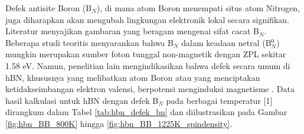 \label{subsec:hbn_defek_bn}
Defek antisite Boron (B$_N$), di mana atom Boron menempati situs atom Nitrogen, juga diharapkan akan mengubah lingkungan elektronik lokal secara signifikan. Literatur menyajikan gambaran yang beragam mengenai sifat cacat B$_N$. Beberapa studi teoritis menyarankan bahwa B$_N$ dalam keadaan netral (B$_N^0$) mungkin merupakan sumber foton tunggal non-magnetik dengan ZPL sekitar 1.58 eV. Namun, penelitian lain mengindikasikan bahwa defek secara umum di hBN, khususnya yang melibatkan atom Boron atau yang menciptakan ketidakseimbangan elektron valensi, berpotensi menginduksi magnetisme \citep{Zhang2020}. Data hasil kalkulasi untuk hBN dengan defek B$_N$ pada berbagai temperatur [1] dirangkum dalam Tabel \ref{tab:hbn_defek_bn} dan diilustrasikan pada Gambar \ref{fig:hbn_BB_800K} hingga \ref{fig:hbn_BB_1225K_spindensity}. \begin{table}[h!]
  \centering
  \caption{Sifat Elektronik dan Magnetik Monolayer hBN dengan Defek Antisite B$_N$ sebagai Fungsi Temperatur.}
  \label{tab:hbn_defek_bn}
\end{table}

